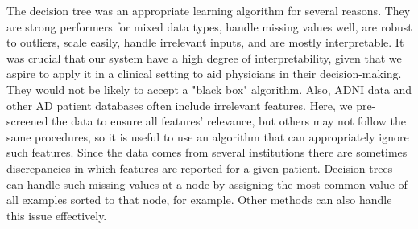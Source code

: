 \documentclass{article}
\begin{document}
The decision tree was an appropriate learning algorithm for several reasons. They are strong performers for mixed data types, handle missing values well, are robust to outliers, scale easily, handle irrelevant inputs, and are mostly interpretable.  It was crucial that our system have a high degree of interpretability, given that we aspire to apply it in a clinical setting to aid physicians in their decision-making. They would not be likely to accept a "black box" algorithm. Also, ADNI data and other AD patient databases often include irrelevant features. Here, we pre-screened the data to ensure all features' relevance, but others may not follow the same procedures, so it is useful to use an algorithm that can appropriately ignore such features. Since the data comes from several institutions there are sometimes discrepancies in which features are reported for a given patient. Decision trees can handle such missing values at a node by assigning the most common value of all examples sorted to that node, for example. Other methods can also handle this issue effectively.






%
%
%
%
\end{document}
